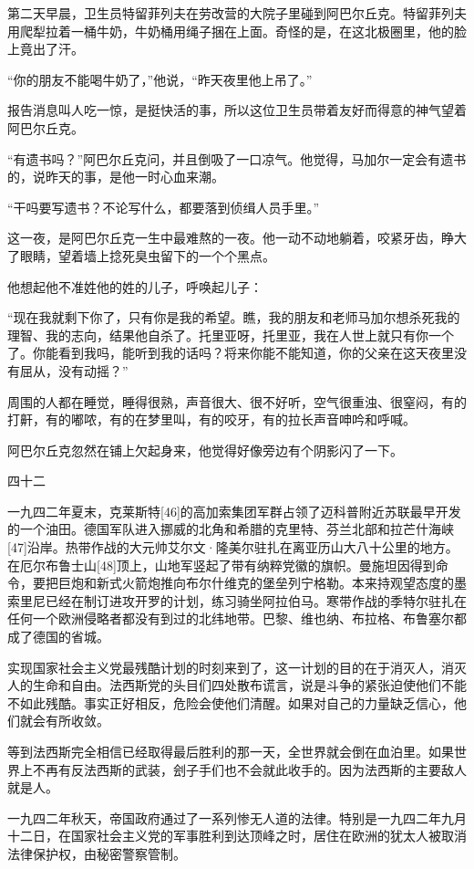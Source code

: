 第二天早晨，卫生员特留菲列夫在劳改营的大院子里碰到阿巴尔丘克。特留菲列夫用爬犁拉着一桶牛奶，牛奶桶用绳子捆在上面。奇怪的是，在这北极圈里，他的脸上竟出了汗。

“你的朋友不能喝牛奶了，”他说，“昨天夜里他上吊了。”

报告消息叫人吃一惊，是挺快活的事，所以这位卫生员带着友好而得意的神气望着阿巴尔丘克。

“有遗书吗？”阿巴尔丘克问，并且倒吸了一口凉气。他觉得，马加尔一定会有遗书的，说昨天的事，是他一时心血来潮。

“干吗要写遗书？不论写什么，都要落到侦缉人员手里。”

这一夜，是阿巴尔丘克一生中最难熬的一夜。他一动不动地躺着，咬紧牙齿，睁大了眼睛，望着墙上捻死臭虫留下的一个个黑点。

他想起他不准姓他的姓的儿子，呼唤起儿子：

“现在我就剩下你了，只有你是我的希望。瞧，我的朋友和老师马加尔想杀死我的理智、我的志向，结果他自杀了。托里亚呀，托里亚，我在人世上就只有你一个了。你能看到我吗，能听到我的话吗？将来你能不能知道，你的父亲在这天夜里没有屈从，没有动摇？”

周围的人都在睡觉，睡得很熟，声音很大、很不好听，空气很重浊、很窒闷，有的打鼾，有的嘟哝，有的在梦里叫，有的咬牙，有的拉长声音呻吟和呼喊。

阿巴尔丘克忽然在铺上欠起身来，他觉得好像旁边有个阴影闪了一下。

四十二

一九四二年夏末，克莱斯特[46]的高加索集团军群占领了迈科普附近苏联最早开发的一个油田。德国军队进入挪威的北角和希腊的克里特、芬兰北部和拉芒什海峡[47]沿岸。热带作战的大元帅艾尔文·隆美尔驻扎在离亚历山大八十公里的地方。在厄尔布鲁士山[48]顶上，山地军竖起了带有纳粹党徽的旗帜。曼施坦因得到命令，要把巨炮和新式火箭炮推向布尔什维克的堡垒列宁格勒。本来持观望态度的墨索里尼已经在制订进攻开罗的计划，练习骑坐阿拉伯马。寒带作战的季特尔驻扎在任何一个欧洲侵略者都没有到过的北纬地带。巴黎、维也纳、布拉格、布鲁塞尔都成了德国的省城。

实现国家社会主义党最残酷计划的时刻来到了，这一计划的目的在于消灭人，消灭人的生命和自由。法西斯党的头目们四处散布谎言，说是斗争的紧张迫使他们不能不如此残酷。事实正好相反，危险会使他们清醒。如果对自己的力量缺乏信心，他们就会有所收敛。

等到法西斯完全相信已经取得最后胜利的那一天，全世界就会倒在血泊里。如果世界上不再有反法西斯的武装，刽子手们也不会就此收手的。因为法西斯的主要敌人就是人。

一九四二年秋天，帝国政府通过了一系列惨无人道的法律。特别是一九四二年九月十二日，在国家社会主义党的军事胜利到达顶峰之时，居住在欧洲的犹太人被取消法律保护权，由秘密警察管制。


